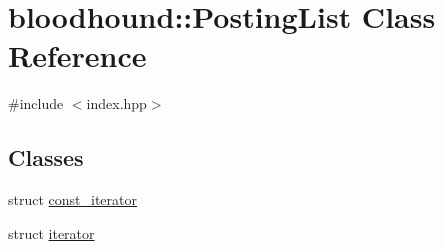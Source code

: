 \hypertarget{classbloodhound_1_1PostingList}{}\section{bloodhound\+:\+:Posting\+List Class Reference}
\label{classbloodhound_1_1PostingList}


{\ttfamily \#include $<$index.\+hpp$>$}

\subsection*{Classes}
\begin{DoxyCompactItemize}
\item 
struct \mbox{\hyperlink{structbloodhound_1_1PostingList_1_1const__iterator}{const\+\_\+iterator}}
\item 
struct \mbox{\hyperlink{structbloodhound_1_1PostingList_1_1iterator}{iterator}}
\end{DoxyCompactItemize}
